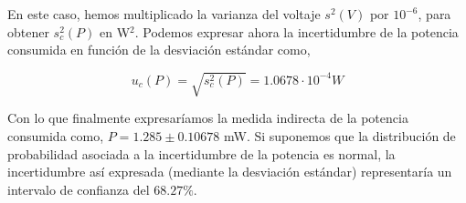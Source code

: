 En este caso, hemos multiplicado la varianza del voltaje $s^2(V)$ por $10^{-6}$, para obtener $s_c^2(P)$ en W$^2$. Podemos expresar ahora la incertidumbre de la potencia consumida en función de la desviación estándar como,

\begin{equation*}
u_c(P) = \sqrt{s_c^2(P)} =  1.0678\cdot 10^{-4} W
\end{equation*}

Con lo que finalmente expresaríamos la medida indirecta de la potencia consumida como, $P = 1.285 \pm 0.10678 $ mW. Si suponemos que la distribución de probabilidad asociada a la incertidumbre de la potencia es normal, la incertidumbre así expresada (mediante la desviación estándar) representaría un intervalo de confianza del $68.27\%$. 

